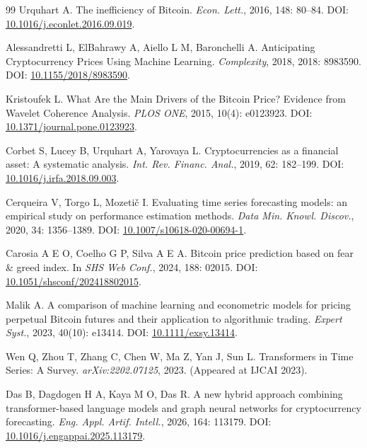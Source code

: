 \documentclass[12pt,a4paper]{ctexart}
\begin{document}
\begin{thebibliography}{99}
Urquhart A.
The inefficiency of Bitcoin.
\textit{Econ. Lett.}, 2016, 148: 80--84.
DOI: \href{https://doi.org/10.1016/j.econlet.2016.09.019}{10.1016/j.econlet.2016.09.019}.

Alessandretti L, ElBahrawy A, Aiello L M, Baronchelli A.
Anticipating Cryptocurrency Prices Using Machine Learning.
\textit{Complexity}, 2018, 2018: 8983590.
DOI: \href{https://doi.org/10.1155/2018/8983590}{10.1155/2018/8983590}.

Kristoufek L.
What Are the Main Drivers of the Bitcoin Price? Evidence from Wavelet Coherence Analysis.
\textit{PLOS ONE}, 2015, 10(4): e0123923.
DOI: \href{https://doi.org/10.1371/journal.pone.0123923}{10.1371/journal.pone.0123923}.

Corbet S, Lucey B, Urquhart A, Yarovaya L.
Cryptocurrencies as a financial asset: A systematic analysis.
\textit{Int. Rev. Financ. Anal.}, 2019, 62: 182--199.
DOI: \href{https://doi.org/10.1016/j.irfa.2018.09.003}{10.1016/j.irfa.2018.09.003}.

Cerqueira V, Torgo L, Mozeti\v{c} I.
Evaluating time series forecasting models: an empirical study on performance estimation methods.
\textit{Data Min. Knowl. Discov.}, 2020, 34: 1356--1389.
DOI: \href{https://doi.org/10.1007/s10618-020-00694-1}{10.1007/s10618-020-00694-1}.

Carosia A E O, Coelho G P, Silva A E A.
Bitcoin price prediction based on fear \& greed index.
In \textit{SHS Web Conf.}, 2024, 188: 02015.
DOI: \href{https://doi.org/10.1051/shsconf/202418802015}{10.1051/shsconf/202418802015}.

Malik A.
A comparison of machine learning and econometric models for pricing perpetual Bitcoin futures and their application to algorithmic trading.
\textit{Expert Syst.}, 2023, 40(10): e13414.
DOI: \href{https://doi.org/10.1111/exsy.13414}{10.1111/exsy.13414}.

Wen Q, Zhou T, Zhang C, Chen W, Ma Z, Yan J, Sun L.
Transformers in Time Series: A Survey.
\textit{arXiv:2202.07125}, 2023. (Appeared at IJCAI 2023).

Das B, Dagdogen H A, Kaya M O, Das R.
A new hybrid approach combining transformer-based language models and graph neural networks for cryptocurrency forecasting.
\textit{Eng. Appl. Artif. Intell.}, 2026, 164: 113179.
DOI: \href{https://doi.org/10.1016/j.engappai.2025.113179}{10.1016/j.engappai.2025.113179}.


\end{thebibliography}
\end{document}
